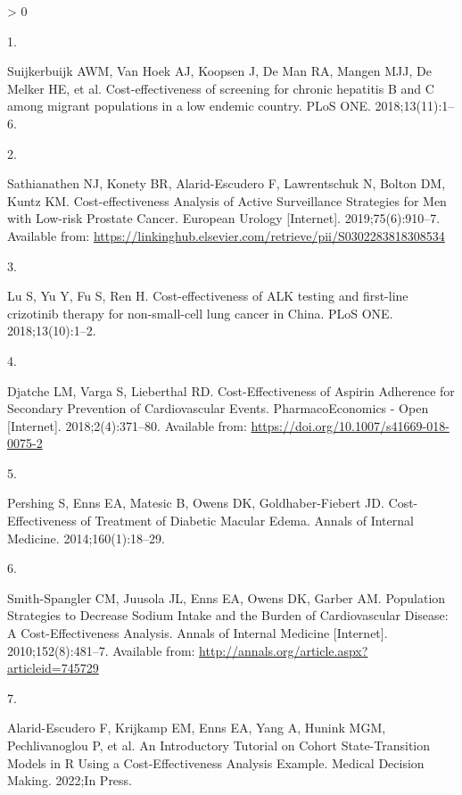 \documentclass[
]{article}
\newlength{\cslhangindent}
\newlength{\csllabelwidth}
\newenvironment{CSLReferences}[2] %
 {%
  \setlength{\parindent}{0pt}
  \ifodd #1 \everypar{\setlength{\hangindent}{\cslhangindent}}\ignorespaces\fi
  \ifnum #2 > 0
  \setlength{\parskip}{#2\baselineskip}
  \fi
 }%
 {}
\newcommand{\CSLLeftMargin}[1]{\parbox[t]{\csllabelwidth}{#1}}
\newcommand{\CSLRightInline}[1]{\parbox[t]{\linewidth - \csllabelwidth}{#1}\break}
\begin{document}
\hypertarget{refs}{}
\begin{CSLReferences}{0}{0}
\leavevmode\hypertarget{ref-Suijkerbuijk2018}{}%
\CSLLeftMargin{1. }
\CSLRightInline{Suijkerbuijk AWM, Van Hoek AJ, Koopsen J, De Man RA, Mangen MJJ, De Melker HE, et al. {Cost-effectiveness of screening for chronic hepatitis B and C among migrant populations in a low endemic country}. PLoS ONE. 2018;13(11):1--6. }

\leavevmode\hypertarget{ref-Sathianathen2018a}{}%
\CSLLeftMargin{2. }
\CSLRightInline{Sathianathen NJ, Konety BR, Alarid-Escudero F, Lawrentschuk N, Bolton DM, Kuntz KM. {Cost-effectiveness Analysis of Active Surveillance Strategies for Men with Low-risk Prostate Cancer}. European Urology {[}Internet{]}. 2019;75(6):910--7. Available from: \url{https://linkinghub.elsevier.com/retrieve/pii/S0302283818308534}}

\leavevmode\hypertarget{ref-Lu2018b}{}%
\CSLLeftMargin{3. }
\CSLRightInline{Lu S, Yu Y, Fu S, Ren H. {Cost-effectiveness of ALK testing and first-line crizotinib therapy for non-small-cell lung cancer in China}. PLoS ONE. 2018;13(10):1--2. }

\leavevmode\hypertarget{ref-Djatche2018}{}%
\CSLLeftMargin{4. }
\CSLRightInline{Djatche LM, Varga S, Lieberthal RD. {Cost-Effectiveness of Aspirin Adherence for Secondary Prevention of Cardiovascular Events}. PharmacoEconomics - Open {[}Internet{]}. 2018;2(4):371--80. Available from: \url{https://doi.org/10.1007/s41669-018-0075-2}}

\leavevmode\hypertarget{ref-Pershing2014}{}%
\CSLLeftMargin{5. }
\CSLRightInline{Pershing S, Enns EA, Matesic B, Owens DK, Goldhaber-Fiebert JD. {Cost-Effectiveness of Treatment of Diabetic Macular Edema}. Annals of Internal Medicine. 2014;160(1):18--29. }

\leavevmode\hypertarget{ref-Smith-Spangler2010}{}%
\CSLLeftMargin{6. }
\CSLRightInline{Smith-Spangler CM, Juusola JL, Enns EA, Owens DK, Garber AM. {Population Strategies to Decrease Sodium Intake and the Burden of Cardiovascular Disease: A Cost-Effectiveness Analysis}. Annals of Internal Medicine {[}Internet{]}. 2010;152(8):481--7. Available from: \url{http://annals.org/article.aspx?articleid=745729}}

\leavevmode\hypertarget{ref-Alarid-Escudero2022b}{}%
\CSLLeftMargin{7. }
\CSLRightInline{Alarid-Escudero F, Krijkamp EM, Enns EA, Yang A, Hunink MGM, Pechlivanoglou P, et al. {An Introductory Tutorial on Cohort State-Transition Models in R Using a Cost-Effectiveness Analysis Example}. Medical Decision Making. 2022;In Press. }


\end{CSLReferences}
\end{document}
